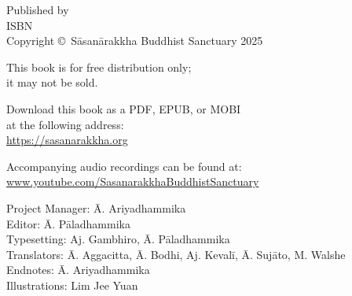 
\cleartoverso
\thispagestyle{empty}

{%

  \ifafiveversion \fontsize{10}{16}\selectfont \fi
  \ifninebythirteenversion \fontsize{7.5}{11}\selectfont \fi
  \ifbfiveversion \fontsize{12}{20}\selectfont \fi
  \centering
  \setlength{\parindent}{0pt}%

  \ifafiveversion \vspace{0.5cm} \fi
  \ifninebythirteenversion \vspace{0.4cm} \fi
  \ifbfiveversion \vspace{0.5cm} \fi

  Published by \publisher\\
  ISBN \theISBN\\
  Copyright \copyright\ Sāsanārakkha Buddhist Sanctuary 2025

  \ifafiveversion \vspace{0.5cm} \fi
  \ifninebythirteenversion \vspace{0.3cm} \fi
  \ifbfiveversion \vspace{0.5cm} \fi

  This book is for free distribution only;\\
  it may not be sold.

  \ifafiveversion \vspace{0.5cm} \fi
  \ifninebythirteenversion \vspace{0.3cm} \fi
  \ifbfiveversion \vspace{0.5cm} \fi

  Download this book as a PDF, EPUB, or MOBI\\
  at the following address:\\
  \href{https://sasanarakkha.org/}{https://sasanarakkha.org}

Accompanying audio recordings can be found at:
\href{www.youtube.com/SasanarakkhaBuddhistSanctuary}{www.youtube.com/SasanarakkhaBuddhistSanctuary}

  \ifafiveversion \vspace{0.5cm} \fi
  \ifninebythirteenversion \vspace{0.3cm} \fi
  \ifbfiveversion \vspace{0.5cm} \fi

  Project Manager: Ā. Ariyadhammika\\
  Editor: Ā. Pāladhammika\\
  Typesetting: Aj. Gambhiro, Ā. Pāladhammika\\
  Translators: Ā. Aggacitta, Ā. Bodhi, Aj. Kevalī, Ā. Sujāto, M. Walshe\\
  Endnotes: Ā. Ariyadhammika\\
  Illustrations: Lim Jee Yuan

}
